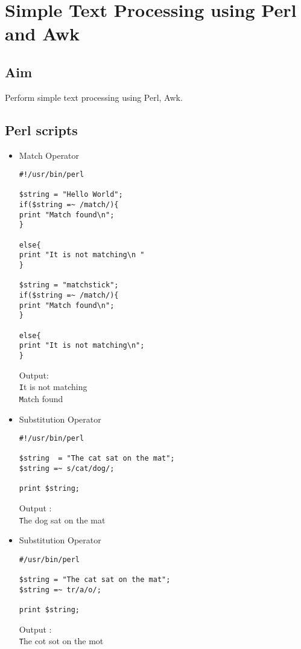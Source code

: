 \documentclass{article}
\begin{document}
\begin{refsection}
\cite{shellbible}
\cite{shellbook}
\printbibliography
\end{refsection}

\newpage
\section{Simple Text Processing using Perl and Awk}

\subsection{Aim}
Perform simple text processing using Perl, Awk.

\subsection{Perl scripts}
\begin{itemize}
     \item Match Operator
\begin{verbatim}
#!/usr/bin/perl

$string = "Hello World";
if($string =~ /match/){
print "Match found\n";
}

else{
print "It is not matching\n "
}

$string = "matchstick";
if($string =~ /match/){
print "Match found\n";
}

else{
print "It is not matching\n";
}

\end{verbatim}

Output:\\

\texttt It is not matching \\
\texttt Match found

     \item Substitution Operator
\begin{verbatim}
#!/usr/bin/perl

$string  = "The cat sat on the mat";
$string =~ s/cat/dog/;

print $string;

\end{verbatim}



Output :\\

\texttt The dog sat on the mat

     \item Substitution Operator
\begin{verbatim}
#/usr/bin/perl

$string = "The cat sat on the mat";
$string =~ tr/a/o/;

print $string;

\end{verbatim}
Output :\\

\texttt The cot sot on the mot
\end{itemize}
\end{document}
